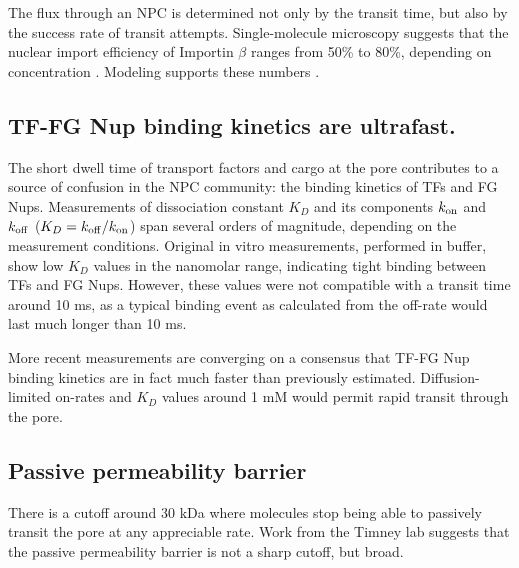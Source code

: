 The flux through an NPC is determined not only by the transit time, but also by the success rate of transit attempts.  Single-molecule microscopy suggests that the nuclear import efficiency of Importin $\beta$ ranges from 50\% to 80\%, depending on concentration \cite{yang06}.  Modeling supports these numbers \cite{zilman07}.

\subsection{TF-FG Nup binding kinetics are ultrafast.}
The short dwell time of transport factors and cargo at the pore contributes to a source of confusion in the NPC community: the binding kinetics of TFs and FG Nups.  Measurements of dissociation constant $K_D$ and its components $k_{\rm on}$ and $k_{\rm off}$ ($K_D = k_{\rm off}/k_{\rm on}$) span several orders of magnitude, depending on the measurement conditions.  Original in vitro measurements, performed in buffer, show low $K_D$ values in the nanomolar range, indicating tight binding between TFs and FG Nups.  However, these values were not compatible with a transit time around 10 ms, as a typical binding event as calculated from the off-rate would last much longer than 10 ms.

More recent measurements are converging on a consensus that TF-FG Nup binding kinetics are in fact much faster than previously estimated.  Diffusion-limited on-rates and $K_D$ values around 1 mM would permit rapid transit through the pore.

\subsection{Passive permeability barrier}
There is a cutoff around 30 kDa where molecules stop being able to passively transit the pore at any appreciable rate.  Work from the Timney lab suggests that the passive permeability barrier is not a sharp cutoff, but broad.

